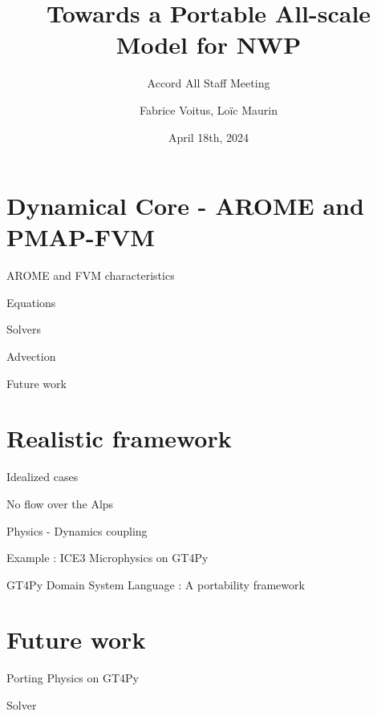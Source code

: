 \documentclass{beamer}
\title[Accord All Staff Meeting]{Towards a Portable All-scale Model for NWP}
\subtitle{Accord All Staff Meeting}
\author{Fabrice Voitus, Loïc Maurin}
\institute[CNRM]{Centre National de Recherche Météorologique}
\date{April 18th, 2024}
\begin{document}
\frame{\titlepage}
\section{Dynamical Core - AROME and PMAP-FVM}

\begin{frame}{AROME and FVM characteristics}
\end{frame}

\begin{frame}{Equations}
\end{frame}

\begin{frame}{Solvers}
\end{frame}

\begin{frame}{Advection}
\end{frame}

\begin{frame}{Future work}
\end{frame}

\section{Realistic framework}

\begin{frame}{Idealized cases}
\end{frame}

\begin{frame}{No flow over the Alps}
\end{frame}

\begin{frame}{Physics - Dynamics coupling}
\end{frame}

\begin{frame}{Example : ICE3 Microphysics on GT4Py}
\end{frame}

\begin{frame}{GT4Py Domain System Language : A portability framework}
\end{frame}

\section{Future work}
\begin{frame}{Porting Physics on GT4Py}
\end{frame}

\begin{frame}{Solver}
\end{frame}
\end{document}
